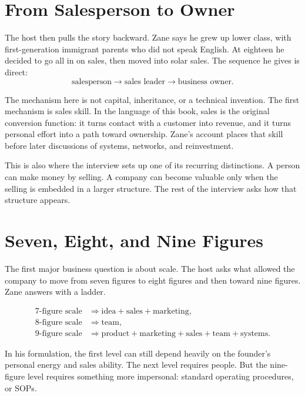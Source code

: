 \section{From Salesperson to Owner}

The host then pulls the story backward. Zane says he grew up lower class, with first-generation immigrant parents who did not speak English. At eighteen he decided to go all in on sales, then moved into solar sales. The sequence he gives is direct:
\begin{equation}
\text{salesperson}\longrightarrow \text{sales leader}\longrightarrow \text{business owner}.
\end{equation}

The mechanism here is not capital, inheritance, or a technical invention. The first mechanism is sales skill. In the language of this book, sales is the original conversion function: it turns contact with a customer into revenue, and it turns personal effort into a path toward ownership. Zane's account places that skill before later discussions of systems, networks, and reinvestment.

This is also where the interview sets up one of its recurring distinctions. A person can make money by selling. A company can become valuable only when the selling is embedded in a larger structure. The rest of the interview asks how that structure appears.

\section{Seven, Eight, and Nine Figures}

The first major business question is about scale. The host asks what allowed the company to move from seven figures to eight figures and then toward nine figures. Zane answers with a ladder.

\begin{align}
7\text{-figure scale} &\Rightarrow \text{idea}+\text{sales}+\text{marketing},\\
8\text{-figure scale} &\Rightarrow \text{team},\\
9\text{-figure scale} &\Rightarrow \text{product}+\text{marketing}+\text{sales}+\text{team}+\text{systems}.
\end{align}

In his formulation, the first level can still depend heavily on the founder's personal energy and sales ability. The next level requires people. But the nine-figure level requires something more impersonal: standard operating procedures, or SOPs.


